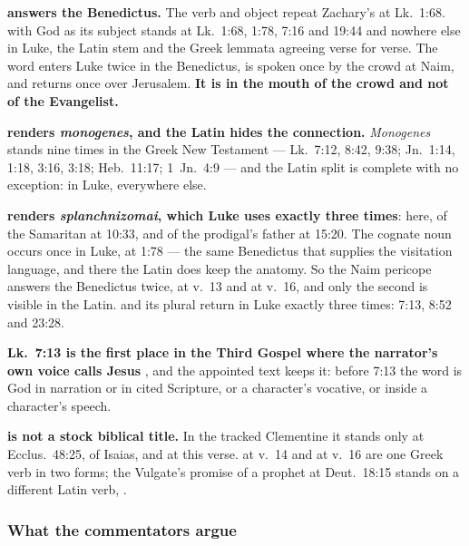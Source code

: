 \textbf{ answers the Benedictus.} The verb and
object repeat Zachary's 
at Lk.\ 1:68.  with God as its subject stands at Lk.\ 1:68, 1:78,
7:16 and 19:44  and nowhere
else in Luke, the Latin stem and the Greek lemmata agreeing verse for verse. The
word enters Luke twice in the
Benedictus, is spoken once by the crowd at Naim, and returns once over Jerusalem.
\textbf{It is in the mouth of the crowd and not of the Evangelist.}

\textbf{ renders \emph{monogenes}, and the Latin hides the
connection.} \emph{Monogenes} stands nine times in the Greek New Testament ---
Lk.\ 7:12, 8:42, 9:38; Jn.\ 1:14, 1:18, 3:16, 3:18; Heb.\ 11:17; 1~Jn.\ 4:9 ---
and the Latin split is complete with no exception: 
in Luke,  everywhere else.

\textbf{ renders \emph{splanchnizomai}, which Luke uses
exactly three times}: here, of the Samaritan at 10:33, and of the prodigal's
father at 15:20. The cognate noun occurs once in Luke, at 1:78  --- the same Benedictus that supplies the visitation
language, and there the Latin does keep the anatomy. So the Naim pericope answers
the Benedictus twice, at v.~13 and at v.~16, and only the second is visible in the
Latin.  and its plural return in Luke exactly three times: 7:13,
8:52 and 23:28.

\textbf{Lk.\ 7:13 is the first place in the Third Gospel where the narrator's own
voice calls Jesus }, and the appointed text keeps it: before 7:13
the word is God in narration or in cited Scripture, or a character's vocative, or
inside a character's speech.

\textbf{ is not a stock biblical title.} In the tracked
Clementine it stands only at Ecclus.\ 48:25, of Isaias, and at this verse.  at v.~14 and  at v.~16 are one Greek verb in
two forms; the Vulgate's promise of a prophet at Deut.\ 18:15 stands on a
different Latin verb, .

\subsubsection*{What the commentators argue}

